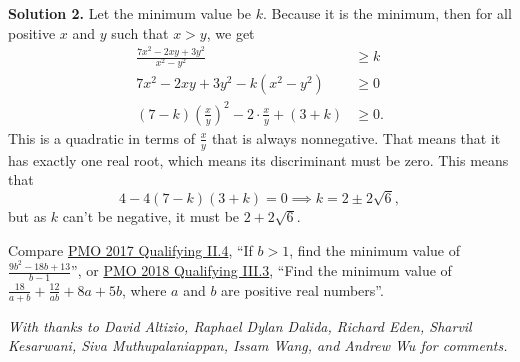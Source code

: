 \documentclass[11pt,paper=letter]{scrartcl}
\newcommand{\soln}[1]{{\sffamily \bfseries Solution #1.}\;}
\newcommand{\rem}[1]{{\small \sffamily \sansmath {\bfseries Remark.} #1}}
\begin{document}
\begin{enumerate}[align=left,leftmargin=*,resume]
\soln2 Let the minimum value be $k$. Because it is the minimum, then for all positive $x$ and $y$ such that $x > y$, we get
\begin{align*}
\frac{7x^2 - 2xy + 3y^2}{x^2 - y^2} &\ge k \\
7x^2 - 2xy + 3y^2 - k(x^2 - y^2) &\ge 0 \\
(7 - k)\left(\frac{x}{y}\right)^2 - 2 \cdot\frac{x}{y} + (3 + k) &\ge 0.
\end{align*}
This is a quadratic in terms of $\frac{x}{y}$ that is always nonnegative. That means that it has exactly one real root, which means its discriminant must be zero. This means that
\[
  4 - 4(7 - k)(3 + k) = 0 \implies k = 2 \pm 2\sqrt{6},
\]
but as $k$ can't be negative, it must be $2 + 2\sqrt{6}$.

\rem{Compare \href{http://pmo.ph/wp-content/uploads/2014/08/19th-PMO-Qualifying-Stage-Questions-and-Answers.pdf}{PMO 2017 Qualifying II.4}, ``If $b > 1$, find the minimum value of $\frac{9b^2 - 18b + 13}{b - 1}$'', or \href{http://pmo.ph/wp-content/uploads/2018/08/PMO-20-Qualifying-Round-with-answers-only.pdf}{PMO 2018 Qualifying III.3}, ``Find the minimum value of $\frac{18}{a + b} + \frac{12}{ab} + 8a + 5b$, where $a$ and $b$ are positive real numbers''.}

\end{enumerate}

\emph{With thanks to David Altizio, Raphael Dylan Dalida, Richard Eden, Sharvil Kesarwani, Siva Muthupalaniappan, Issam Wang, and Andrew Wu for comments.}
\end{document}

